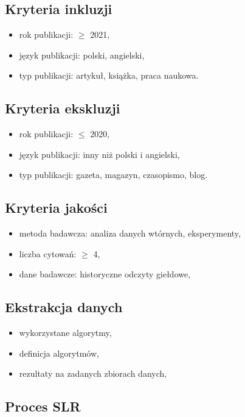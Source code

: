 \documentclass[polish,envcountsect,10pt]{article}
\begin{document}
\subsection{Kryteria inkluzji}

\begin{itemize}
	\item rok publikacji: $\ge$ 2021,
	\item język publikacji: polski, angielski,
	\item typ publikacji: artykuł, książka, praca naukowa.
\end{itemize}

\subsection{Kryteria ekskluzji}

\begin{itemize}
	\item rok publikacji: $\le$ 2020,
	\item język publikacji: inny niż polski i angielski,
	\item typ publikacji: gazeta, magazyn, czasopismo, blog.
\end{itemize}

\subsection{Kryteria jakości}

\begin{itemize}
	\item metoda badawcza: analiza danych wtórnych, eksperymenty,
	\item liczba cytowań: $\ge$ 4,
	\item dane badawcze: historyczne odczyty giełdowe,
\end{itemize}

\subsection{Ekstrakcja danych}

\begin{itemize}
	\item wykorzystane algorytmy,
	\item definicja algorytmów,
	\item rezultaty na zadanych zbiorach danych,
\end{itemize}

\subsection{Proces SLR}
\end{document}
